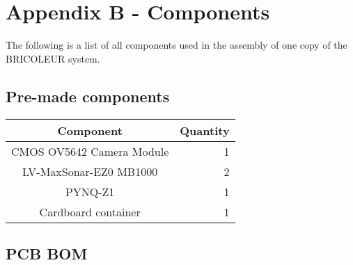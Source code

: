 

\section{Appendix B - Components}
The following is a list of all components used in the assembly of one copy of the BRICOLEUR system. 
\subsection{Pre-made components}
\begin{tabular}{c | r}
    Component & Quantity            \\ \hline
    CMOS OV5642 Camera Module  & 1  \\
    LV-MaxSonar-EZ0 MB1000 & 2      \\
    PYNQ-Z1 & 1                     \\
    Cardboard container & 1          \\
\end{tabular}

\subsection{PCB BOM}

